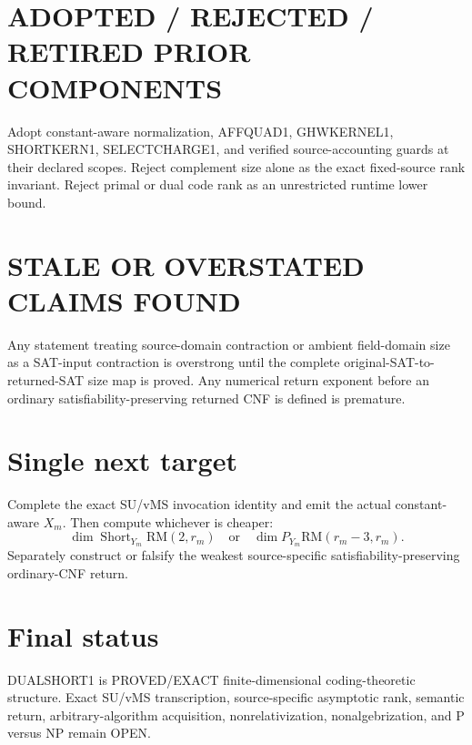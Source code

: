 \documentclass[11pt]{article}
\begin{document}
\section*{ADOPTED / REJECTED / RETIRED PRIOR COMPONENTS}
Adopt constant-aware normalization, AFFQUAD1, GHWKERNEL1, SHORTKERN1, SELECTCHARGE1, and verified source-accounting guards at their declared scopes. Reject complement size alone as the exact fixed-source rank invariant. Reject primal or dual code rank as an unrestricted runtime lower bound.

\section*{STALE OR OVERSTATED CLAIMS FOUND}
Any statement treating source-domain contraction or ambient field-domain size as a SAT-input contraction is overstrong until the complete original-SAT-to-returned-SAT size map is proved. Any numerical return exponent before an ordinary satisfiability-preserving returned CNF is defined is premature.

\section*{Single next target}
Complete the exact SU/vMS invocation identity and emit the actual constant-aware \(X_m\). Then compute whichever is cheaper:
\[
\dim\operatorname{Short}_{Y_m}\mathrm{RM}(2,r_m)
\quad\text{or}\quad
\dim P_{Y_m}\mathrm{RM}(r_m-3,r_m).
\]
Separately construct or falsify the weakest source-specific satisfiability-preserving ordinary-CNF return.

\section*{Final status}
DUALSHORT1 is PROVED/EXACT finite-dimensional coding-theoretic structure. Exact SU/vMS transcription, source-specific asymptotic rank, semantic return, arbitrary-algorithm acquisition, nonrelativization, nonalgebrization, and P versus NP remain OPEN.

\end{document}
